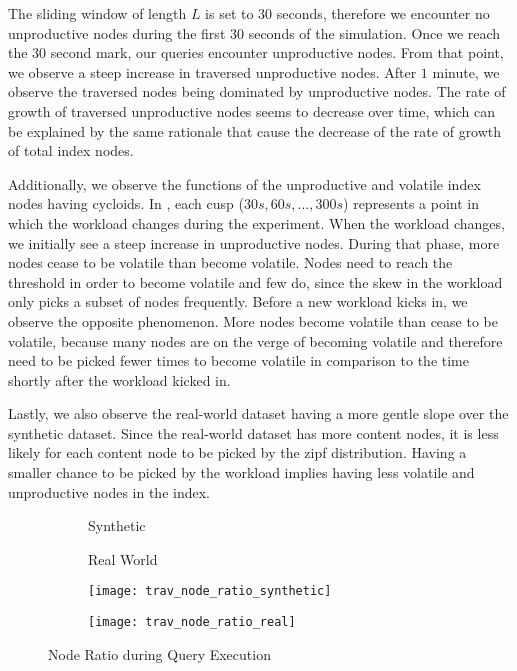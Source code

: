 \message{ !name(thesis.tex)}\documentclass[abstracton,12pt]{scrartcl}
\theoremstyle{definition}
\begin{document}
The sliding window of length $L$ is set to $30$ seconds, therefore we encounter no
unproductive nodes during the first $30$ seconds of the simulation. Once we
reach the $30$ second mark, our queries encounter unproductive nodes.
From that point, we observe a steep increase in traversed unproductive nodes.
After $1$ minute, we observe the traversed nodes being dominated by
unproductive nodes. The rate of growth of traversed unproductive nodes seems to
decrease over time, which can be explained by the same rationale that cause the
decrease of the rate of growth of total index nodes.

Additionally, we observe the functions of the unproductive and volatile index
nodes having cycloids. In , each cusp ($30 s, 60 s,
\dots, 300 s$) represents a point in which the workload changes during the
experiment. When the workload changes, we initially see a steep increase in
unproductive nodes. During that phase, more nodes cease to be volatile than
become volatile. Nodes need to reach the threshold in order to become volatile
and few do, since the skew in the workload only picks a subset of
nodes frequently. Before a new workload kicks in, we observe the opposite
phenomenon. More nodes become volatile than cease to be volatile, because many nodes are
on the verge of becoming volatile and therefore need to be picked fewer times to
become volatile in comparison to the time shortly after the workload kicked in. 

Lastly, we also observe the real-world dataset having a more gentle slope over
the synthetic dataset. Since
the real-world dataset has more content nodes, it is less likely for each
content node to be picked by the zipf distribution. Having a smaller chance to be
picked by the workload implies having less volatile and unproductive nodes in
the index.  

\begin{figure}
  \centering
  \begin{subfigure}{0.49\linewidth}
    \centering
    Synthetic
  \end{subfigure}
  \begin{subfigure}{0.49\linewidth}
    \centering
    Real World
  \end{subfigure}
  \begin{subfigure}{0.49\linewidth}
    \centering
    \texttt{[image: trav\_node\_ratio\_synthetic]}
    \caption{}
    \label{fig:trav_node_ratio_synthetic}
  \end{subfigure}
  \begin{subfigure}{0.49\linewidth}
    \centering
    \texttt{[image: trav\_node\_ratio\_real]}
    \caption{}
    \label{fig:trav_node_ratio_real}
  \end{subfigure}
  \caption{Node Ratio during Query Execution}
  \label{fig:trav_node_ratio}
\end{figure}
\end{document}
